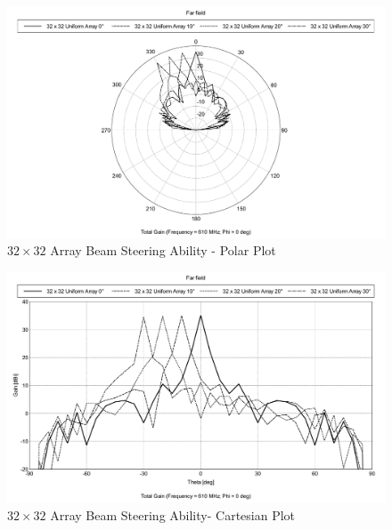 \documentclass[11pt]{witseiepaper}
\begin{document}
\begin{bibunit}[witseie]
\begin{figure}[htb]
    \centering
    \includegraphics[width=0.9\linewidth]{SteeringSmall-Polar.pdf}
    \caption{$32 \times 32$ Array Beam Steering Ability - Polar Plot}
    \label{fig:SteeringSmall-Polar}
\end{figure}

\begin{figure}[htb]
    \centering
    \includegraphics[width=0.9\linewidth]{SteeringSmall-Cartesian.pdf}
    \caption{$32 \times 32$ Array Beam Steering Ability- Cartesian Plot}
        \label{fig:SteeringSmall-Cartesian}
\end{figure}




\end{bibunit}
\end{document}
